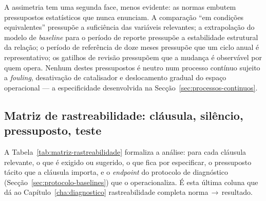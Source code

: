 A assimetria tem uma segunda face, menos evidente: as normas embutem pressupostos estatísticos que nunca enunciam. A comparação \enquote{em condições equivalentes} pressupõe a suficiência das variáveis relevantes; a extrapolação do modelo de \emph{baseline} para o período de reporte pressupõe a estabilidade estrutural da relação; o período de referência de doze meses pressupõe que um ciclo anual é representativo; os gatilhos de revisão pressupõem que a mudança é observável por quem opera.  Nenhum destes pressupostos é neutro num processo contínuo sujeito a
\emph{fouling}, desativação de catalisador e deslocamento gradual do espaço
operacional --- a especificidade desenvolvida na
Secção~\ref{sec:processos-continuos}. 

\subsection{Matriz de rastreabilidade: cláusula, silêncio, pressuposto, teste}
\label{sec:assimetria-matriz}

A Tabela~\ref{tab:matriz-rastreabilidade} formaliza a análise: para cada cláusula relevante, o que é exigido ou sugerido, o que fica por especificar, o pressuposto tácito que a cláusula importa, e o \emph{endpoint} do protocolo de diagnóstico (Secção~\ref{sec:protocolo-baselines}) que o operacionaliza. É esta última coluna que dá ao Capítulo~\ref{cha:diagnostico} rastreabilidade completa norma\,$\to$\,resultado.


